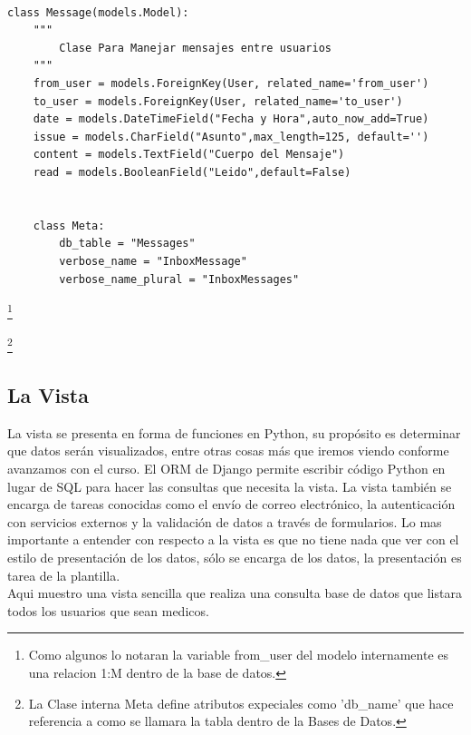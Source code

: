 \begin{lstlisting}[style=Python]

class Message(models.Model):
    """
        Clase Para Manejar mensajes entre usuarios
    """
    from_user = models.ForeignKey(User, related_name='from_user')
    to_user = models.ForeignKey(User, related_name='to_user')
    date = models.DateTimeField("Fecha y Hora",auto_now_add=True)
    issue = models.CharField("Asunto",max_length=125, default='')
    content = models.TextField("Cuerpo del Mensaje")
    read = models.BooleanField("Leido",default=False)


    class Meta:
        db_table = "Messages"
        verbose_name = "InboxMessage"
        verbose_name_plural = "InboxMessages"
\end{lstlisting}

\footnote{Como algunos lo notaran la variable from\_user del modelo internamente
es una relacion 1:M dentro de la base de datos.}

\footnote{La Clase interna Meta define atributos expeciales como 'db\_name' que hace
referencia a como se llamara la tabla dentro de la Bases de Datos.}

\vspace{0.1cm}

\subsection{La Vista}
La vista se presenta en forma de funciones en Python, su propósito es
determinar que datos serán visualizados, entre otras cosas más que iremos
viendo conforme avanzamos con el curso. El ORM de Django permite escribir
código Python en lugar de SQL para hacer las consultas que necesita la vista.
La vista también se encarga de tareas conocidas como el envío de correo
electrónico, la autenticación con servicios externos y la validación de
datos a través de formularios. Lo mas importante a entender con respecto a la
 vista es que no tiene nada que ver con el estilo de presentación de los
 datos, sólo se encarga de los datos, la presentación es tarea de la plantilla.\\[0.1cm]


Aqui muestro una vista sencilla que realiza una consulta base de datos que listara todos
los usuarios que sean medicos. \\[0.1cm]

